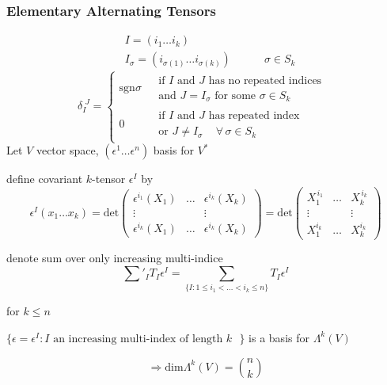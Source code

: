\subsubsection*{ Elementary Alternating Tensors }

\[
\begin{aligned}
  & I = (i_1 \dots i_k) \\ 
  & I_{\sigma} = (i_{\sigma(1)} \dots i_{\sigma(k)} ) \quad \quad \quad \sigma \in S_k
\end{aligned} 
\]
\[
\delta_I^{ \, \, J} = \begin{cases} \text{sgn}{\sigma} & \begin{gathered} \text{ if $I$ and $J$ has no repeated indices }\\ 
    \text{ and $J = I_{\sigma}$ for some $\sigma \in S_k$ } \end{gathered} \\
  0 & \begin{gathered} \text{ if $I$ and $J$ has repeated index } \\
    \text{ or $J \neq I_{\sigma} \quad \, \forall \, \sigma \in S_k $ } \end{gathered}
\end{cases}
\]
Let $V$ vector space, $(\epsilon^1 \dots \epsilon^n)$ basis for $V^*$ 

define covariant $k$-tensor $\epsilon^I$ by 
\[
\epsilon^I(x_1 \dots x_k) = \text{det}{ \left( \begin{matrix} \epsilon^{i_1}(X_1)  & \dots & \epsilon^{i_k}(X_k) \\ 
    \vdots & & \vdots \\ \epsilon^{i_k}(X_1) & \dots  & \epsilon^{i_k}(X_k) \end{matrix} \right) } = \text{det}{ \left( \begin{matrix} X_1^{\, i_1} & \dots & X_k^{\, i_k }  \\ \vdots &  & \vdots \\ X_1^{i_k} & \dots & X_k^{i_k} \end{matrix} \right) }
\]

denote sum over only increasing multi-indice
\[
\sum'_I T_I \epsilon^I = \sum_{ \lbrace I : 1\leq i_1 < \dots < i_k \leq n \rbrace } T_I \epsilon^I
\]

\begin{proposition}[12.5] for $k\leq n$

$\lbrace \epsilon =  \epsilon^I : I \text{ an increasing multi-index of length $k$ } \rbrace$ is a basis for $\Lambda^k(V)$ 
\end{proposition}
\[
\Longrightarrow \text{dim}{ \Lambda^k(V) }= \binom{n}{k} 
\]



